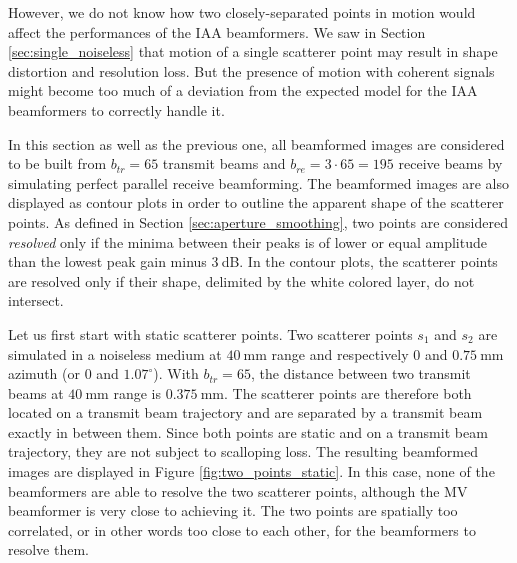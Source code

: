 However, we do not know how two closely-separated points in motion would affect the performances of the IAA beamformers.
We saw in Section \ref{sec:single_noiseless} that motion of a single scatterer point may result in shape distortion and resolution loss.
But the presence of motion with coherent signals might become too much of a deviation from the expected model for the IAA beamformers to correctly handle it.

In this section as well as the previous one, all beamformed images are considered to be built from $b_{tr} = 65$ transmit beams and $b_{re} = 3 \cdot 65 = 195$ receive beams by simulating perfect parallel receive beamforming. The beamformed images are also displayed as contour plots in order to outline the apparent shape of the scatterer points.
As defined in Section \ref{sec:aperture_smoothing}, two points are considered \textit{resolved} only if the minima between their peaks is of lower or equal amplitude than the lowest peak gain minus $3~$dB.
In the contour plots, the scatterer points are resolved only if their shape, delimited by the white colored layer, do not intersect.

Let us first start with static scatterer points. Two scatterer points $s_1$ and $s_2$ are simulated in a noiseless medium at $40~$mm range and respectively 0 and $0.75~$mm azimuth (or 0 and $1.07^\circ$).
With $b_{tr} = 65$, the distance between two transmit beams at $40~$mm range is $0.375~$mm. The scatterer points are therefore both located on a transmit beam trajectory and are separated by a transmit beam exactly in between them.
Since both points are static and on a transmit beam trajectory, they are not subject to scalloping loss.
The resulting beamformed images are displayed in Figure \ref{fig:two_points_static}.
In this case, none of the beamformers are able to resolve the two scatterer points, although the MV beamformer is very close to achieving it. The two points are spatially too correlated, or in other words too close to each other, for the beamformers to resolve them.

